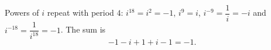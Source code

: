 Powers of $i$ repeat with period $4$: $i^{18}=i^2=-1$, $i^{9}=i$, $i^{-9}=\dfrac{1}{i}=-i$ and $i^{-18}=\dfrac{1}{i^{18}}=-1$. The sum is
\[-1-i+1+i-1=\boxed{-1}.\]
